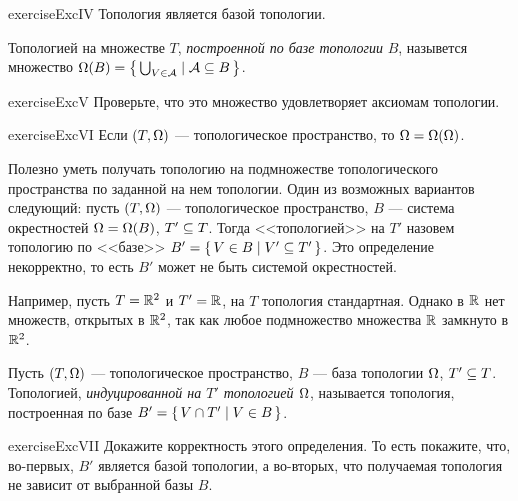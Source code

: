 \documentclass[main]{subfiles}
\begin{document}
\begin{restatable}{exercise}{ExcIV}
	Топология является базой топологии.
\end{restatable}

\begin{definition}
	Топологией на множестве $ T $, \emph{построенной по базе топологии} $ B $, назывется множество
	$ \Omega(B) = \left\{\, \bigcup_{V \in \mathcal{A}} \mid \mathcal{A} \subseteq B \,\right\} $.
\end{definition}

\begin{restatable}{exercise}{ExcV}
	Проверьте, что это множество удовлетворяет аксиомам топологии.
\end{restatable}

\begin{restatable}{exercise}{ExcVI}
	Если $ (T, \Omega) $ --- топологическое пространство, то $ \Omega = \Omega(\Omega) $.
\end{restatable}

Полезно уметь получать топологию на подмножестве топологического пространства по заданной на нем топологии.
Один из возможных вариантов следующий: пусть $ (T, \Omega) $ --- топологическое пространство, $ B $ --- система
окрестностей $ \Omega = \Omega(B) $, $ T' \subseteq T $. Тогда <<топологией>> на $ T' $ назовем топологию по <<базе>>
$ B' = \left\{\, V \in B \mid V' \subseteq T' \,\right\} $. Это определение некорректно, то есть $ B' $ может не быть системой
окрестностей.

\begin{example}
	Например, пусть $ T = \mathbb{R}^2 $ и $ T' = \mathbb{R} $, на $ T $ топология стандартная. Однако в $ \mathbb{R} $ нет
	множеств, открытых в $ \mathbb{R}^2 $, так как любое подмножество множества $ \mathbb{R} $ замкнуто в $ \mathbb{R}^2 $.
\end{example}

\begin{definition}
	Пусть $ (T, \Omega) $ --- топологическое пространство, $ B $ --- база топологии $ \Omega $, $ T' \subseteq T $.
	Топологией, \emph{индуцированной на $ T' $ топологией $ \Omega $}, называется топология, построенная по базе
	$ B' = \left\{\, V \cap T' \mid V \in B \,\right\} $.
\end{definition}

\begin{restatable}{exercise}{ExcVII}
	Докажите корректность этого определения. То есть покажите, что, во-первых, $ B' $ является базой топологии, а
	во-вторых, что получаемая топология не зависит от выбранной базы $ B $.
\end{restatable}
\end{document}
